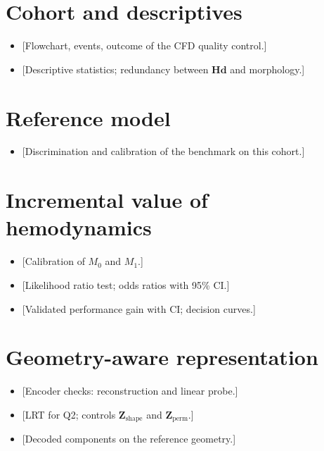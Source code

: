 \section{Cohort and descriptives}
\begin{itemize}
    \item {[}Flowchart, events, outcome of the CFD quality control.]
    \item {[}Descriptive statistics; redundancy between $\mathbf{Hd}$ and morphology.]
\end{itemize}

\section{Reference model}
\begin{itemize}
    \item {[}Discrimination and calibration of the benchmark on this cohort.]
\end{itemize}

\section{Incremental value of hemodynamics}
\begin{itemize}
    \item {[}Calibration of $M_0$ and $M_1$.]
    \item {[}Likelihood ratio test; odds ratios with 95\% CI.]
    \item {[}Validated performance gain with CI; decision curves.]
\end{itemize}

\section{Geometry-aware representation}
\begin{itemize}
    \item {[}Encoder checks: reconstruction and linear probe.]
    \item {[}LRT for Q2; controls $\mathbf{Z}_{\text{shape}}$ and $\mathbf{Z}_{\text{perm}}$.]
    \item {[}Decoded components on the reference geometry.]
\end{itemize}
